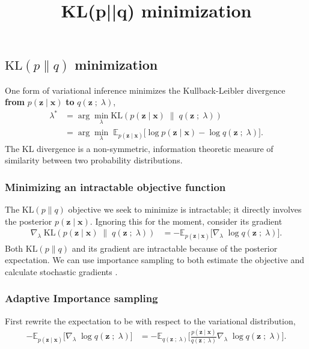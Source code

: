 \title{KL(p||q) minimization}

\subsection{$\text{KL}(p\|q)$ minimization}

One form of variational inference minimizes the Kullback-Leibler divergence
\textbf{from} $p(\mathbf{z} \mid \mathbf{x})$ \textbf{to} $q(\mathbf{z}\;;\;\lambda)$,
\begin{align*}
  \lambda^*
  &=
  \arg\min_\lambda \text{KL}(
  p(\mathbf{z} \mid \mathbf{x})
  \;\|\;
  q(\mathbf{z}\;;\;\lambda)
  )\\
  &=
  \arg\min_\lambda\;
  \mathbb{E}_{p(\mathbf{z} \mid \mathbf{x})}
  \big[
  \log p(\mathbf{z} \mid \mathbf{x})
  -
  \log q(\mathbf{z}\;;\;\lambda)
  \big].
\end{align*}
The KL divergence is a non-symmetric, information theoretic measure of
similarity between two probability distributions.

\subsubsection{Minimizing an intractable objective function}

The $\text{KL}(p\|q)$ objective we seek to minimize is intractable; it directly
involves the posterior $p(\mathbf{z} \mid \mathbf{x})$. Ignoring this for the moment, consider its
gradient
\begin{align*}
  \nabla_\lambda\;
  \text{KL}(
  p(\mathbf{z} \mid \mathbf{x})
  \;\|\;
  q(\mathbf{z}\;;\;\lambda)
  )
  &=
  -
  \mathbb{E}_{p(\mathbf{z} \mid \mathbf{x})}
  \big[
  \nabla_\lambda\;
  \log q(\mathbf{z}\;;\;\lambda)
  \big].
\end{align*}
Both $\text{KL}(p\|q)$ and its gradient are intractable
because of the posterior expectation.
We can use importance sampling to both
estimate the objective and calculate stochastic gradients
\citep{oh1992adaptive}.

\subsubsection{Adaptive Importance sampling}

First rewrite the expectation to be with respect to the variational
distribution,
\begin{align*}
  -
  \mathbb{E}_{p(\mathbf{z} \mid \mathbf{x})}
  \big[
  \nabla_\lambda\;
  \log q(\mathbf{z}\;;\;\lambda)
  \big]
  &=
  -
  \mathbb{E}_{q(\mathbf{z}\;;\;\lambda)}
  \Bigg[
  \frac{p(\mathbf{z} \mid \mathbf{x})}{q(\mathbf{z}\;;\;\lambda)}
  \nabla_\lambda\;
  \log q(\mathbf{z}\;;\;\lambda)
  \Bigg].
\end{align*}

